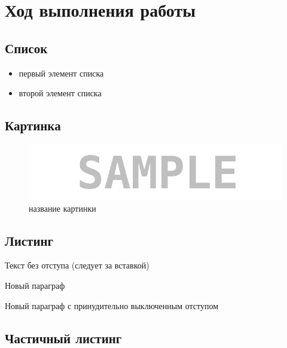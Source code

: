 \section{Ход выполнения работы}

\subsection{Список}

\begin{itemize}
\item первый элемент списка
\item второй элемент списка
\end{itemize}


\subsection{Картинка}

\begin{figure}[H]
	\begin{center}
		\includegraphics[scale=0.7]{pics/sample}
		\caption{название картинки} 
		\label{pic:pic_name} %
	\end{center}
\end{figure}


\subsection{Листинг}


\parindent=1cm %
Текст без отступа (следует за вставкой)

Новый параграф

\noindent Новый параграф с принудительно выключенным отступом


\subsection{Частичный листинг}
\makeatletter
\def\lst@PlaceNumber{\llap{\normalfont
                \lst@numberstyle{\the\lst@lineno}\kern\lst@numbersep}}
\makeatother

